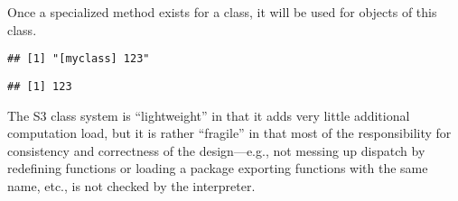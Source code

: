 \documentclass[krantz2]{krantz}\usepackage{knitr}
\begin{document}
\begin{explainbox}
Once a specialized method exists for a class, it will be used for objects of this class.

\begin{knitrout}\footnotesize
{}\color{fgcolor}\begin{kframe}
\begin{alltt}
\end{alltt}
\begin{verbatim}
## [1] "[myclass] 123"
\end{verbatim}
\begin{alltt}
\hlstd{(}
\end{alltt}
\begin{verbatim}
## [1] 123
\end{verbatim}
\end{kframe}
\end{knitrout}
\end{explainbox}

\begin{warningbox}
 The S3 class system is ``lightweight'' in that it adds very little additional computation load, but it is rather ``fragile'' in that most of the responsibility for consistency and correctness of the design---e.g., not messing up dispatch by redefining functions or loading a package exporting functions with the same name, etc., is not checked by the \Rlang interpreter.
\end{warningbox}

%
%
%
%
%
%
%
%
%
%
\end{document}

